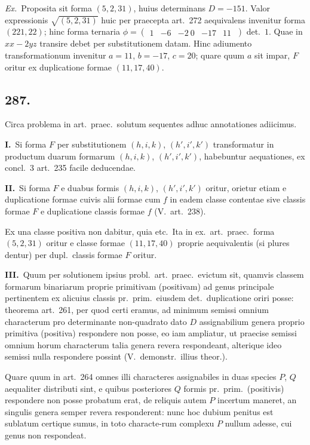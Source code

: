\documentclass[12pt,a4paper]{article}
\theoremstyle{plain}
\theoremstyle{definition}
\theoremstyle{remark}
\begin{document}
\textit{Ex.}\ Proposita sit forma $(5, 2, 31)$, huius determinans $D = -151$. Valor expressionis $\sqrt{(5, 2, 31)}$ huic per praecepta art.\ 272 aequivalens invenitur forma $(221, 22)$; hinc forma ternaria $\phi = \begin{pmatrix} 1 & -6 & -2 \ 0 & -17 & 11 \ \end{pmatrix}$ det.\ $1$. Quae in $xx - 2yz$ transire debet per substitutionem datam. Hinc adiumento transformationum invenitur $a = 11$, $b = -17$, $c = 20$; quare quum $a$ sit impar, $F$ oritur ex duplicatione formae $(11, 17, 40)$.

\subsection*{287.}

Circa problema in art.\ praec.\ solutum sequentes adhuc annotationes adiicimus.

\textbf{I.}\ Si forma $F$ per substitutionem $(h, i, k)$, $(h', i', k')$ transformatur in productum duarum formarum $(h, i, k)$, $(h', i', k')$, habebuntur aequationes, ex concl.\ 3 art.\ 235 facile deducendae.

\textbf{II.}\ Si forma $F$ e duabus formis $(h, i, k)$, $(h', i', k')$ oritur, orietur etiam e duplicatione formae cuivis alii formae cum $f$ in eadem classe contentae sive classis formae $F$ e duplicatione classis formae $f$ (V.\ art.\ 238).

Ex una classe positiva non dabitur, quia etc.\ Ita in ex.\ art.\ praec.\ forma $(5, 2, 31)$ oritur e classe formae $(11, 17, 40)$ proprie aequivalentis (si plures dentur) per dupl.\ classis formae $F$ oritur.

\textbf{III.}\ Quum per solutionem ipsius probl.\ art.\ praec.\ evictum sit, quamvis classem formarum binariarum proprie primitivam (positivam) ad genus principale pertinentem ex alicuius classis pr.\ prim.\ eiusdem det.\ duplicatione oriri posse: theorema art.\ 261, per quod certi eramus, ad minimum semissi omnium characterum pro determinante non-quadrato dato $D$ assignabilium genera proprio primitiva (positiva) respondere non posse, eo iam ampliatur, ut praecise semissi omnium horum characterum talia genera revera respondeant, alterique ideo semissi nulla respondere possint (V.\ demonstr.\ illius theor.).

Quare quum in art.\ 264 omnes illi characteres assignabiles in duas species $P$, $Q$ aequaliter distributi sint, e quibus posteriores $Q$ formis pr.\ prim.\ (positivis) respondere non posse probatum erat, de reliquis autem $P$ incertum maneret, an singulis genera semper revera responderent: nunc hoc dubium penitus est sublatum certique sumus, in toto characte-rum complexu $P$ nullum adesse, cui genus non respondeat.
\end{document}
